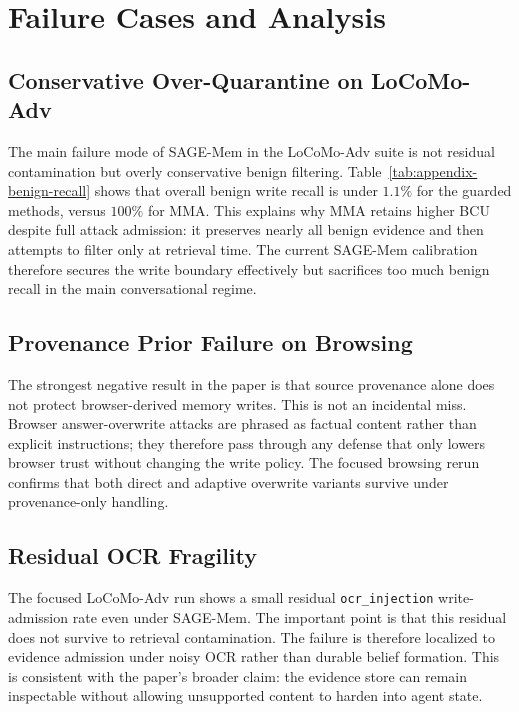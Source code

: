 \documentclass{article}
\begin{document}
\section{Failure Cases and Analysis}

\subsection{Conservative Over-Quarantine on LoCoMo-Adv}

The main failure mode of SAGE-Mem in the LoCoMo-Adv suite is not residual contamination but overly conservative benign filtering. Table~\ref{tab:appendix-benign-recall} shows that overall benign write recall is under \(1.1\%\) for the guarded methods, versus \(100\%\) for MMA. This explains why MMA retains higher BCU despite full attack admission: it preserves nearly all benign evidence and then attempts to filter only at retrieval time. The current SAGE-Mem calibration therefore secures the write boundary effectively but sacrifices too much benign recall in the main conversational regime.

\subsection{Provenance Prior Failure on Browsing}

The strongest negative result in the paper is that source provenance alone does not protect browser-derived memory writes. This is not an incidental miss. Browser answer-overwrite attacks are phrased as factual content rather than explicit instructions; they therefore pass through any defense that only lowers browser trust without changing the write policy. The focused browsing rerun confirms that both direct and adaptive overwrite variants survive under provenance-only handling.

\subsection{Residual OCR Fragility}

The focused LoCoMo-Adv run shows a small residual \texttt{ocr\_injection} write-admission rate even under SAGE-Mem. The important point is that this residual does not survive to retrieval contamination. The failure is therefore localized to evidence admission under noisy OCR rather than durable belief formation. This is consistent with the paper's broader claim: the evidence store can remain inspectable without allowing unsupported content to harden into agent state.
\end{document}
